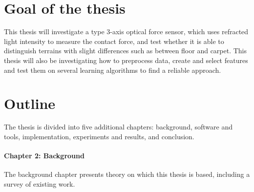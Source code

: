 \documentclass[USenglish]{ifimaster}  %
\begin{document}
\section{Goal of the thesis}
This thesis will investigate a type 3-axis optical force sensor, which uses refracted light intensity to measure the contact force, and test whether it is able to distinguish terrains with slight differences such as between floor and carpet. This thesis will also be investigating how to preprocess data, create and select features and test them on several learning algorithms to find a reliable approach.

\section{Outline}
The thesis is divided into five additional chapters: background, software and tools, implementation, experiments and results, and conclusion. 	
	
\paragraph{Chapter 2: Background}
The background chapter presents theory on which this thesis is based, including a survey of existing work.
\end{document}
